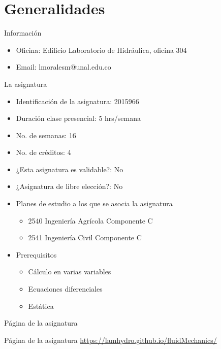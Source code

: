 \documentclass [xcolor=svgnames, t] {beamer}
\begin{document}
\section{Generalidades}
\begin{frame}{Informaci\'on}
\begin{exampleblock}{}
\begin{itemize}
\item \alert{Oficina}: Edificio Laboratorio de Hidr\'aulica, oficina 304 
\item \alert{Email}: lmoralesm@unal.edu.co
\end{itemize}
\end{exampleblock}
\end{frame}

\begin{frame}{La asignatura}
\begin{itemize}
\item Identificaci\'on de la asignatura: \alert{2015966}
\item Duraci\'on clase presencial: \alert{5 hrs/semana}
\item No. de semanas: \alert{16}
\item No. de cr\'editos: \alert{4}
\item ¿Esta asignatura es validable?: \alert{No}
\item ¿Asignatura de libre elecci\'on?: \alert{No}
\item Planes de estudio a los que se asocia la asignatura
\begin{itemize}
\item \alert{2540 Ingenier\'ia Agr\'icola Componente C}
\item \alert{2541 Ingenier\'ia Civil Componente C}
\end{itemize}
\item Prerequisitos
\begin{itemize}
\item \alert{C\'alculo en varias variables}
\item \alert{Ecuaciones diferenciales}
\item \alert{Est\'atica}
\end{itemize}
\end{itemize}
\end{frame}

\begin{frame}{P\'agina de la asignatura}
\begin{block}{P\'agina de la asignatura}
\href{https://lamhydro.github.io/fluidMechanics/}{https://lamhydro.github.io/fluidMechanics/}
\end{block}
\end{frame}
\end{document}

